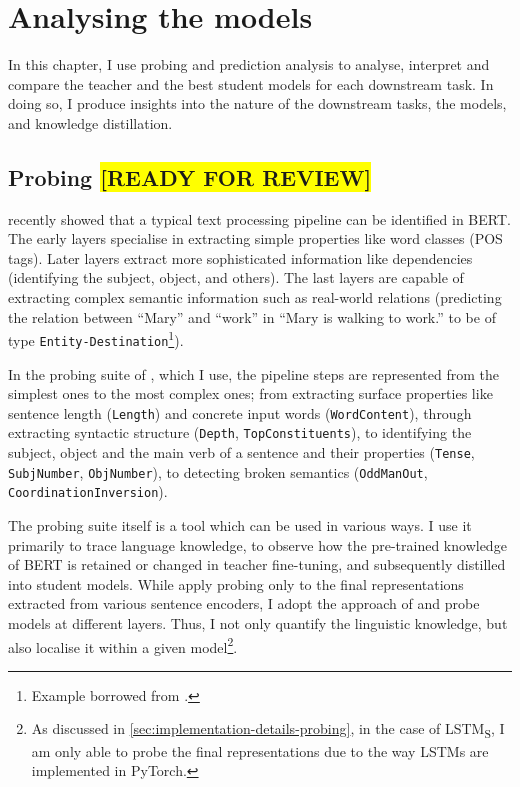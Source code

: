\documentclass[bsc,frontabs,twoside,singlespacing,parskip,deptreport]{infthesis}
\def\reviewready{\colorbox{yellow}{[READY FOR REVIEW]}}
\def\LSTMS{LSTM\textsubscript{S}}
\begin{document}
\chapter{Analysing the models}{
  In this chapter, I use probing and prediction analysis to analyse, interpret and compare the teacher and the best student models for each downstream task. In doing so, I produce insights into the nature of the downstream tasks, the models, and knowledge distillation.

  \section{Probing \reviewready}{
    \citet{Tenney_2019b} recently showed that a typical text processing pipeline can be identified in BERT. The early layers specialise in extracting simple properties like word classes (POS tags).
    Later layers extract more sophisticated information like dependencies (identifying the subject, object, and others).
    The last layers are capable of extracting complex semantic information such as real-world relations (predicting the relation between ``Mary'' and ``work'' in ``Mary is walking to work.'' to be of type \verb|Entity-Destination|\footnote{Example borrowed from \citet[p. 4]{Tenney_2019a}.}).
    
    In the probing suite of \citet{Conneau_2018}, which I use, the pipeline steps are represented from the simplest ones to the most complex ones; from extracting surface properties like sentence length (\verb|Length|) and concrete input words (\verb|WordContent|), through extracting syntactic structure (\verb|Depth|, \verb|TopConstituents|), to identifying the subject, object and the main verb of a sentence and their properties (\verb|Tense|, \verb|SubjNumber|, \verb|ObjNumber|), to detecting broken semantics (\verb|OddManOut|, \verb|CoordinationInversion|).

    The probing suite itself is a tool which can be used in various ways. I use it primarily to trace language knowledge, to observe how the pre-trained knowledge of BERT is retained or changed in teacher fine-tuning, and subsequently distilled into student models.
    While \citeauthor{Conneau_2018} apply probing only to the final representations extracted from various sentence encoders, I adopt the approach of \citeauthor{Tenney_2019b} and probe models at different layers. Thus, I not only quantify the linguistic knowledge, but also localise it within a given model\footnote{As discussed in \autoref{sec:implementation-details-probing}, in the case of \LSTMS, I am only able to probe the final representations due to the way LSTMs are implemented in PyTorch.}.
    
}}
\end{document}
